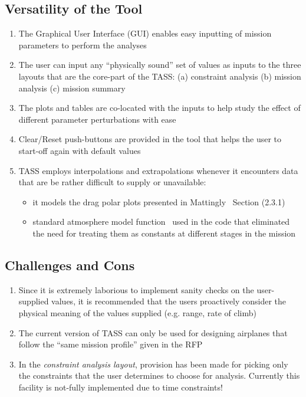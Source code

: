 \documentclass[pdftex,11pt,letter]{article}
\begin{document}
\subsection{Versatility of the Tool}

\begin{enumerate}

\item The Graphical User Interface (GUI) enables easy inputting of mission parameters to perform the analyses


\item The user can input any ``physically sound'' set of values as inputs to the three layouts that are the core-part of the TASS: (a) constraint analysis (b) mission analysis (c) mission summary

\item The plots and tables are co-located with the inputs to help study the effect of different parameter perturbations with ease


\item Clear/Reset push-buttons are provided in the tool that helps the user to start-off again with default values

\item TASS employs interpolations and extrapolations whenever it encounters data that are be rather difficult to supply or unavailable:

\begin{itemize}
\item it models the drag polar plots presented in Mattingly~\cite{MattinglyText} Section (2.3.1)
\item standard atmosphere model function~\cite{sky} used in the code that eliminated the need for treating them as constants at different stages in the mission
\end{itemize}

\end{enumerate}

\subsection{Challenges and Cons}

\begin{enumerate}

\item  Since it is extremely laborious to implement sanity checks on the user-supplied values, it is recommended that the users proactively consider the physical meaning of the values supplied (e.g. range, rate of climb)

\item The current version of TASS can only be used for designing airplanes that follow the ``same mission profile'' given in the RFP


\item In the \textit{constraint analysis layout}, provision has been made for picking only the constraints that the user determines to choose for analysis. Currently this facility is not-fully implemented due to time constraints!
\end{enumerate}
\end{document}
